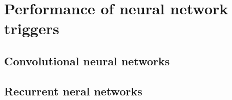 
\chapter{Performance of neural network triggers}
\label{chap:neural-network-triggers}


\section{Convolutional neural networks}
\label{sec:cnn-performance}


\section{Recurrent neral networks}
\label{sec:lstm-performance}